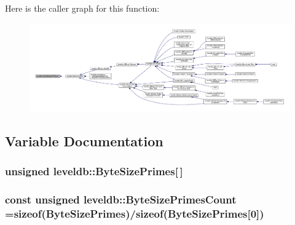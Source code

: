 Here is the caller graph for this function\+:
\nopagebreak
\begin{figure}[H]
\begin{center}
\leavevmode
\includegraphics[width=350pt]{namespaceleveldb_aaa2ccf468819a9d769dd0bf38674a6e9_icgraph}
\end{center}
\end{figure}




\subsection{Variable Documentation}
\hypertarget{namespaceleveldb_aba6f91cadb787d48e7534dfeaa5422be}{}
\subsubsection[{Byte\+Size\+Primes}]{\setlength{\rightskip}{0pt plus 5cm}unsigned leveldb\+::\+Byte\+Size\+Primes\mbox{[}$\,$\mbox{]}\hspace{0.3cm}{\ttfamily [static]}}\label{namespaceleveldb_aba6f91cadb787d48e7534dfeaa5422be}
\hypertarget{namespaceleveldb_a718ea58cbfcecd6d7bddc94661756618}{}
\subsubsection[{Byte\+Size\+Primes\+Count}]{\setlength{\rightskip}{0pt plus 5cm}const unsigned leveldb\+::\+Byte\+Size\+Primes\+Count =sizeof({\bf Byte\+Size\+Primes})/sizeof({\bf Byte\+Size\+Primes}\mbox{[}0\mbox{]})\hspace{0.3cm}{\ttfamily [static]}}\label{namespaceleveldb_a718ea58cbfcecd6d7bddc94661756618}
\hypertarget{namespaceleveldb_abacb49d42ee3c64ccbc0ce22391816d4}{}
